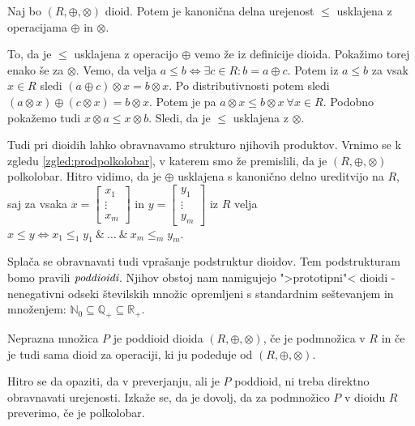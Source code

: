 \documentclass[mat1]{fmfdelo}
\newcommand{\N}{\mathbb{N}}
\newcommand{\No}{\N_0}
\newcommand{\Pplus}[1]{\mathbb{#1}_{+}}
\newcommand{\pojem}[1]{\ensuremath{\emph{#1}}}
\begin{document}
\begin{trditev}
	Naj bo $(R, \oplus, \otimes)$ dioid. Potem je kanonična delna urejenost $\leq$ usklajena z operacijama $\oplus$ in $\otimes$.
\end{trditev}
\begin{dokaz}
	To, da je $\leq$ usklajena z operacijo $\oplus$ vemo že iz definicije dioida. Pokažimo torej enako še za $\otimes$.
	Vemo, da velja $a\leq b \iff \exists c\in R: b = a \oplus c$. Potem iz $a \leq b$ za vsak $x\in R$ sledi $(a \oplus c) \otimes x = b \otimes x$.
	Po distributivnosti potem sledi $(a\otimes x) \oplus (c \otimes x) = b\otimes x$. Potem je pa $a\otimes x \leq b\otimes x ~\forall x\in R$. Podobno pokažemo tudi $x \otimes a \leq x \otimes b$. Sledi, da je $\leq$ usklajena z $\otimes$.
\end{dokaz}

Tudi pri dioidih lahko obravnavamo strukturo njihovih produktov. Vrnimo se k zgledu \ref{zgled:prodpolkolobar}, v katerem smo že premislili, da je $(R, \oplus, \otimes)$ polkolobar. Hitro vidimo, da je $\oplus$ usklajena s kanonično delno ureditvijo na $R$, saj za vsaka $x = \begin{bmatrix} x_1 \\ \vdots \\ x_m \end{bmatrix}$ in $y = \begin{bmatrix} y_1 \\ \vdots \\ y_m \end{bmatrix}$ iz $R$ velja $x \leq y \iff x_1 \leq_1 y_1 ~\&~ \ldots ~\&~ x_m \leq_m y_m$.

Splača se obravnavati tudi vprašanje podstruktur dioidov. Tem podstrukturam bomo pravili \pojem{poddioidi}. Njihov obstoj nam namigujejo ">prototipni"< dioidi - nenegativni odseki številskih množic opremljeni s standardnim seštevanjem in množenjem: $\No\subseteq\Pplus{Q}\subseteq\Pplus{R}$.

\begin{definicija}
	Neprazna množica $P$ je poddioid dioida $(R, \oplus, \otimes)$, če je podmnožica v $R$ in če je tudi sama dioid za operaciji, ki ju podeduje od $(R, \oplus, \otimes)$.
\end{definicija}

Hitro se da opaziti, da v preverjanju, ali je $P$ poddioid, ni treba direktno obravnavati urejenosti. Izkaže se, da je dovolj, da za podmnožico $P$ v dioidu $R$ preverimo, če je polkolobar.
\end{document}
